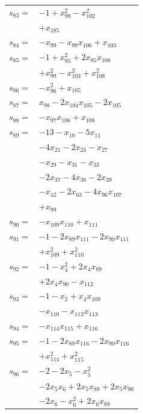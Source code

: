 \begin{longtable}{@{}r@{\;}l@{}}
\(s_{83}=\) & \(\displaystyle -1 +x_{98}^{2} -x_{102}^{2}\) \\
 & \(\displaystyle +x_{185}\) \\[3pt]
\(s_{84}=\) & \(\displaystyle -x_{99} -x_{99}x_{100} +x_{103}\) \\[3pt]
\(s_{85}=\) & \(\displaystyle -1 +x_{95}^{2} +2x_{95}x_{108}\) \\
 & \(\displaystyle +x_{99}^{2} -x_{103}^{2} +x_{108}^{2}\) \\[3pt]
\(s_{86}=\) & \(\displaystyle -x_{96}^{2} +x_{105}\) \\[3pt]
\(s_{87}=\) & \(\displaystyle x_{98} -2x_{104}x_{105} -2x_{105}\) \\[3pt]
\(s_{88}=\) & \(\displaystyle -x_{97}x_{106} +x_{108}\) \\[3pt]
\(s_{89}=\) & \(\displaystyle -13 -x_{10} -5x_{11}\) \\
 & \(\displaystyle -4x_{21} -2x_{23} -x_{27}\) \\
 & \(\displaystyle -x_{29} -x_{31} -x_{33}\) \\
 & \(\displaystyle -2x_{37} -4x_{38} -2x_{39}\) \\
 & \(\displaystyle -x_{42} -2x_{63} -4x_{96}x_{107}\) \\
 & \(\displaystyle +x_{99}\) \\[3pt]
\(s_{90}=\) & \(\displaystyle -x_{109}x_{110} +x_{111}\) \\[3pt]
\(s_{91}=\) & \(\displaystyle -1 -2x_{89}x_{111} -2x_{90}x_{111}\) \\
 & \(\displaystyle +x_{109}^{2} +x_{110}^{2}\) \\[3pt]
\(s_{92}=\) & \(\displaystyle -1 -x_{4}^{2} +2x_{4}x_{89}\) \\
 & \(\displaystyle +2x_{4}x_{90} -x_{112}\) \\[3pt]
\(s_{93}=\) & \(\displaystyle -1 -x_{2} +x_{4}x_{109}\) \\
 & \(\displaystyle -x_{110} -x_{112}x_{113}\) \\[3pt]
\(s_{94}=\) & \(\displaystyle -x_{114}x_{115} +x_{116}\) \\[3pt]
\(s_{95}=\) & \(\displaystyle -1 -2x_{89}x_{116} -2x_{90}x_{116}\) \\
 & \(\displaystyle +x_{114}^{2} +x_{115}^{2}\) \\[3pt]
\(s_{96}=\) & \(\displaystyle -2 -2x_{5} -x_{5}^{2}\) \\
 & \(\displaystyle -2x_{5}x_{6} +2x_{5}x_{89} +2x_{5}x_{90}\) \\
 & \(\displaystyle -2x_{6} -x_{6}^{2} +2x_{6}x_{89}\) \\

\end{longtable}
